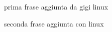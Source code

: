 \documentclass[a4paper]{article}
\begin{document}
prima frase aggiunta da gigi linux

seconda frase aggiunta con linux
\end{document}
